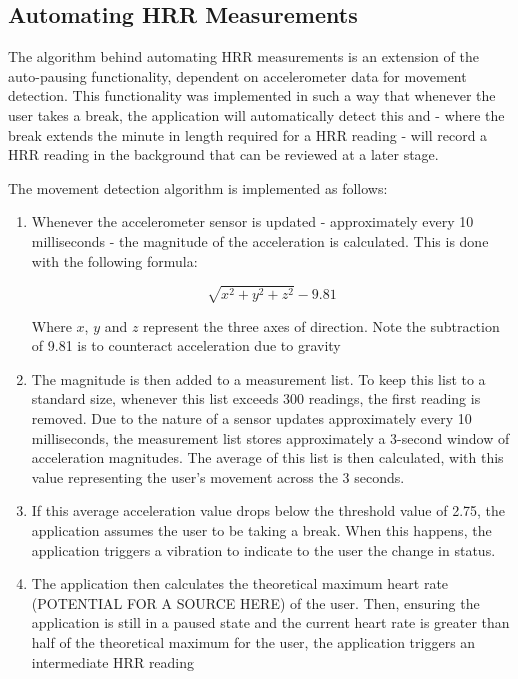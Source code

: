 \documentclass{l4proj}
\begin{document}
\subsection{Automating HRR Measurements}

The algorithm behind automating HRR measurements is an extension of the auto-pausing functionality, dependent on accelerometer data for movement detection. This functionality was implemented in such a way that whenever the user takes a break, the application will automatically detect this and - where the break extends the minute in length required for a HRR reading - will record a HRR reading in the background that can be reviewed at a later stage.

The movement detection algorithm is implemented as follows:

\begin{enumerate}
    \item Whenever the accelerometer sensor is updated - approximately every 10 milliseconds - the magnitude of the acceleration is calculated. This is done with the following formula:

    $$
    \sqrt{x^2 + y^2 + z^2} - 9.81
    $$
    
    Where $x$, $y$ and $z$ represent the three axes of direction. Note the subtraction of 9.81 is to counteract acceleration due to gravity
    \item The magnitude is then added to a measurement list. To keep this list to a standard size, whenever this list exceeds 300 readings, the first reading is removed. Due to the nature of a sensor updates approximately every 10 milliseconds, the measurement list stores approximately a 3-second window of acceleration magnitudes. The average of this list is then calculated, with this value representing the user’s movement across the 3 seconds.
    \item If this average acceleration value drops below the threshold value of 2.75, the application assumes the user to be taking a break. When this happens, the application triggers a vibration to indicate to the user the change in status. 
    \item The application then calculates the theoretical maximum heart rate (POTENTIAL FOR A SOURCE HERE) of the user. Then, ensuring the application is still in a paused state and the current heart rate is greater than half of the theoretical maximum for the user, the application triggers an intermediate HRR reading
\end{enumerate}
\end{document}
